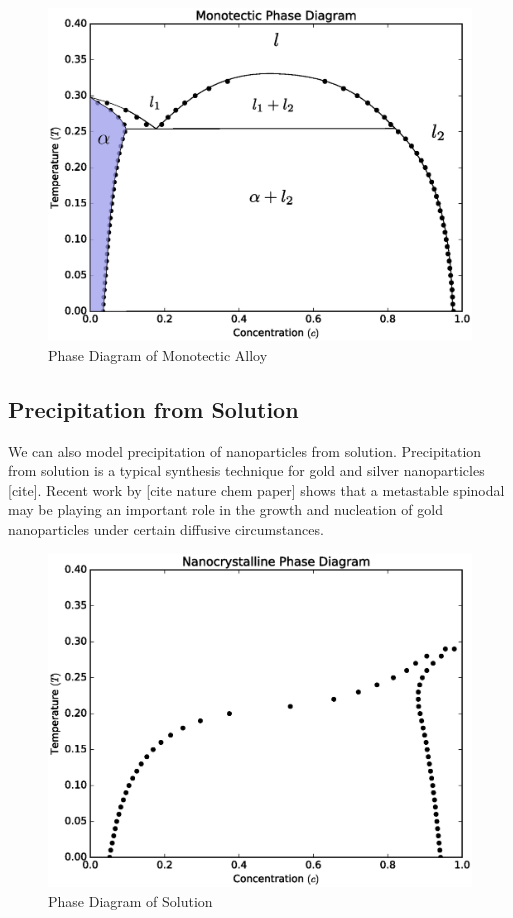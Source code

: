 \documentclass[showkeys, reprint]{revtex4-1}
\begin{document}
\begin{figure}
	\includegraphics[scale=0.3]{monotectic.eps}
	\caption{\label{monotectic} Phase Diagram of Monotectic Alloy}
\end{figure}

\subsection{Precipitation from Solution}

We can also model precipitation of nanoparticles from solution. Precipitation from solution is a typical synthesis technique for gold and silver nanoparticles [cite]. Recent work by [cite nature chem paper] shows that a metastable spinodal may be playing an important role in the growth and nucleation of gold nanoparticles under certain diffusive circumstances.

\begin{figure}
	\includegraphics[scale=0.3]{solution.eps}
	\caption{\label{precip} Phase Diagram of Solution}
\end{figure}
\end{document}
